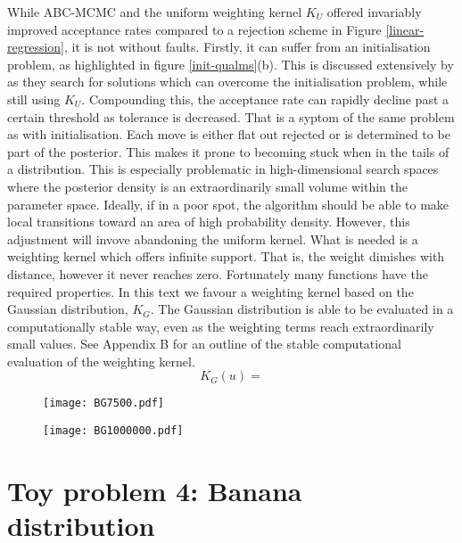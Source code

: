 While ABC-MCMC and the uniform weighting kernel $K_U$ offered invariably improved acceptance rates compared to a rejection scheme in Figure \ref{linear-regression}, it is not without faults. Firstly, it can suffer from an initialisation problem, as highlighted in figure \ref{init-qualms}(b). This is discussed extensively by \citep{Sisson2010a} as they search for solutions which can overcome the initialisation problem, while still using $K_U$. Compounding this, the acceptance rate can rapidly decline past a certain threshold as tolerance is decreased. That is a syptom of the same problem as with initialisation. Each move is either flat out rejected or is determined to be part of the posterior. This makes it prone to becoming stuck when in the tails of a distribution. This is especially problematic in high-dimensional search spaces where the posterior density is an extraordinarily small volume within the parameter space. Ideally, if in a poor spot, the algorithm should be able to make local transitions toward an area of high probability density. However, this adjustment will invove abandoning the uniform kernel. What is needed is a weighting kernel which offers infinite support. That is, the weight dimishes with distance, however it never reaches zero. Fortunately many functions have the required properties. In this text we favour a  weighting kernel based on the Gaussian distribution, $K_G$. The Gaussian distribution is able to be evaluated in a computationally stable way, even as the weighting terms reach extraordinarily small values. See Appendix B for an outline of the stable computational evaluation of the weighting kernel.\\

\begin{equation}
K_G(u) = 
\end{equation}

\begin{figure}[H]
	\centering
	\texttt{[image: BG7500.pdf]}
	\caption{}
\end{figure}

\begin{figure}[H]
	\centering
	\texttt{[image: BG1000000.pdf]}
	\caption{}
\end{figure}



\section{Toy problem 4: Banana distribution}

